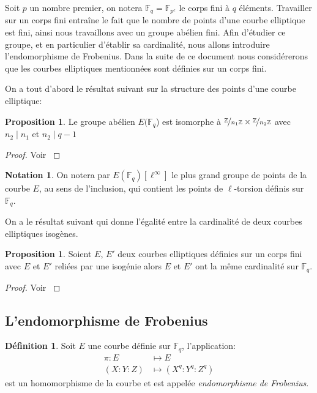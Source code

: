 \documentclass[10pt,a4paper]{book}
\theoremstyle{plain}
\theoremstyle{definition}
\theoremstyle{definition}
\theoremstyle{definition}
\theoremstyle{definition}
\newtheorem{prop}[thm]{Proposition}
\theoremstyle{definition}
\newtheorem{defi}[thm]{Définition}
\theoremstyle{remark}
\theoremstyle{remark}
\theoremstyle{definition}
\newtheorem{nota}[thm]{Notation}
\begin{document}
Soit $p$ un nombre premier, on notera $\mathbb{F}_q=\mathbb{F}_{p^e}$ le corps 
fini à $q$ éléments. Travailler sur un corps fini entraîne le fait que le 
nombre de points d'une courbe elliptique est fini, ainsi nous travaillons avec 
un groupe abélien fini. Afin d'étudier ce groupe, et en particulier d'établir 
sa cardinalité, nous allons introduire l'endomorphisme de Frobenius. Dans la 
suite de ce document nous considérerons que les courbes elliptiques mentionnées
sont définies sur un corps fini.

On a tout d'abord le résultat suivant sur la structure des points d'une courbe elliptique:
\begin{prop}
Le groupe abélien $E(\mathbb{F}_q$) est isomorphe à $\nicefrac{\mathbb{Z}}{n_1 \mathbb{Z}} \times \nicefrac{\mathbb{Z}}{n_2 \mathbb{Z}}$ avec $n_2 \mid n_1$ et $n_2 \mid q-1$
\end{prop}

\begin{proof}
Voir \cite[Theorem 4.1]{Washington2008}
\end{proof}

\begin{nota}
On notera par $E(\mathbb{F}_q)[\ell^{\infty}]$ le plus grand groupe de points 
de la courbe $E$, au sens de l'inclusion, qui contient les points de 
$\ell$-torsion définis sur $\mathbb{F}_q$.
\end{nota}

On a le résultat suivant qui donne l'égalité entre la cardinalité de deux courbes elliptiques isogènes.

\begin{prop}
\label{pro:iso:ega}
Soient $E$, $E'$ deux courbes elliptiques définies sur un corps fini avec $E$ et $E'$ reliées par une isogénie alors $E$ et $E'$ ont la même cardinalité sur $\mathbb{F}_q$.
\end{prop}

\begin{proof}
Voir \cite[Exercise V.5.4.a]{Silv1}
\end{proof}

\subsection{L'endomorphisme de Frobenius}
\begin{defi}
Soit $E$ une courbe définie sur $\mathbb{F}_q$, l'application: 
\begin{equation*}
\begin{alignedat}{1}
\pi :E &\mapsto  E  \\
 (X:Y:Z)  &\mapsto (X^q:Y^q:Z^q)  
\end{alignedat}
\end{equation*}
est un homomorphisme de la courbe et est appelée \emph{endomorphisme de Frobenius}. 
\end{defi}
\end{document}
